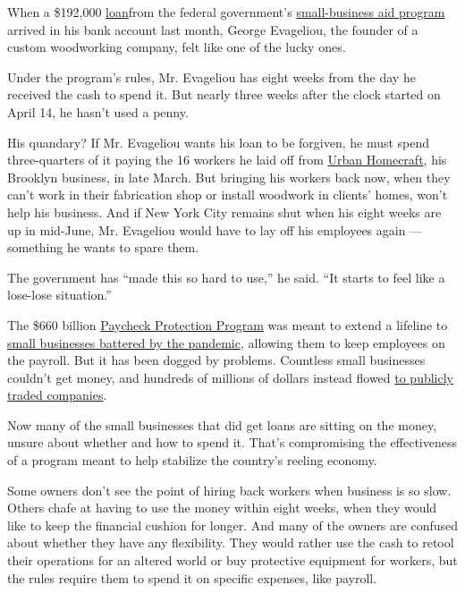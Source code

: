 When a \$192,000
\href{https://www.nytimes3xbfgragh.onion/2020/05/13/business/paycheck-protection-program-small-business.html}{loan}from
the federal government's
\href{https://www.nytimes3xbfgragh.onion/2020/05/13/business/paycheck-protection-program-small-business.html}{small-business
aid program} arrived in his bank account last month, George Evageliou,
the founder of a custom woodworking company, felt like one of the lucky
ones.

Under the program's rules, Mr. Evageliou has eight weeks from the day he
received the cash to spend it. But nearly three weeks after the clock
started on April 14, he hasn't used a penny.

His quandary? If Mr. Evageliou wants his loan to be forgiven, he must
spend three-quarters of it paying the 16 workers he laid off from
\href{http://www.urbanhomecraft.com/about}{Urban Homecraft}, his
Brooklyn business, in late March. But bringing his workers back now,
when they can't work in their fabrication shop or install woodwork in
clients' homes, won't help his business. And if New York City remains
shut when his eight weeks are up in mid-June, Mr. Evageliou would have
to lay off his employees again --- something he wants to spare them.

The government has ``made this so hard to use,'' he said. ``It starts to
feel like a lose-lose situation.''

The \$660 billion
\href{https://www.nytimes3xbfgragh.onion/2020/06/30/us/politics/ppp-extension.html}{Paycheck
Protection Program} was meant to extend a lifeline to
\href{https://www.nytimes3xbfgragh.onion/2020/07/13/business/small-businesses-coronavirus.html}{small
businesses battered by the pandemic}, allowing them to keep employees on
the payroll. But it has been dogged by problems. Countless small
businesses couldn't get money, and hundreds of millions of dollars
instead flowed
\href{https://www.nytimes3xbfgragh.onion/2020/04/26/business/coronavirus-small-business-loans-large-companies.html}{to
publicly traded companies}.

Now many of the small businesses that did get loans are sitting on the
money, unsure about whether and how to spend it. That's compromising the
effectiveness of a program meant to help stabilize the country's reeling
economy.

Some owners don't see the point of hiring back workers when business is
so slow. Others chafe at having to use the money within eight weeks,
when they would like to keep the financial cushion for longer. And many
of the owners are confused about whether they have any flexibility. They
would rather use the cash to retool their operations for an altered
world or buy protective equipment for workers, but the rules require
them to spend it on specific expenses, like payroll.

